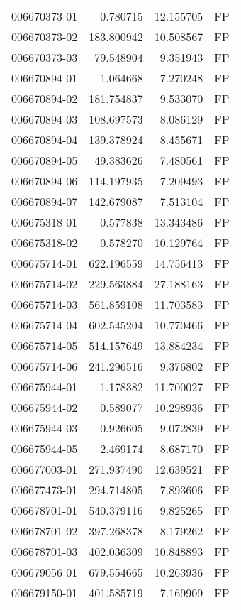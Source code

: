 \begin{tabular}{lrrl}
006670373-01 &    0.780715 &    12.155705 &   FP \\
006670373-02 &  183.800942 &    10.508567 &   FP \\
006670373-03 &   79.548904 &     9.351943 &   FP \\
006670894-01 &    1.064668 &     7.270248 &   FP \\
006670894-02 &  181.754837 &     9.533070 &   FP \\
006670894-03 &  108.697573 &     8.086129 &   FP \\
006670894-04 &  139.378924 &     8.455671 &   FP \\
006670894-05 &   49.383626 &     7.480561 &   FP \\
006670894-06 &  114.197935 &     7.209493 &   FP \\
006670894-07 &  142.679087 &     7.513104 &   FP \\
006675318-01 &    0.577838 &    13.343486 &   FP \\
006675318-02 &    0.578270 &    10.129764 &   FP \\
006675714-01 &  622.196559 &    14.756413 &   FP \\
006675714-02 &  229.563884 &    27.188163 &   FP \\
006675714-03 &  561.859108 &    11.703583 &   FP \\
006675714-04 &  602.545204 &    10.770466 &   FP \\
006675714-05 &  514.157649 &    13.884234 &   FP \\
006675714-06 &  241.296516 &     9.376802 &   FP \\
006675944-01 &    1.178382 &    11.700027 &   FP \\
006675944-02 &    0.589077 &    10.298936 &   FP \\
006675944-03 &    0.926605 &     9.072839 &   FP \\
006675944-05 &    2.469174 &     8.687170 &   FP \\
006677003-01 &  271.937490 &    12.639521 &   FP \\
006677473-01 &  294.714805 &     7.893606 &   FP \\
006678701-01 &  540.379116 &     9.825265 &   FP \\
006678701-02 &  397.268378 &     8.179262 &   FP \\
006678701-03 &  402.036309 &    10.848893 &   FP \\
006679056-01 &  679.554665 &    10.263936 &   FP \\
006679150-01 &  401.585719 &     7.169909 &   FP \\

\end{tabular}
